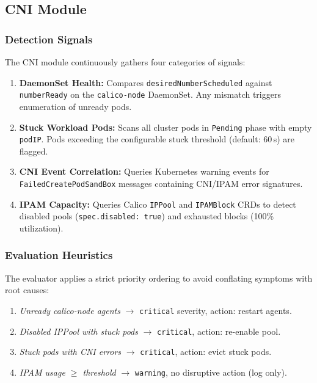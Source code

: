 \documentclass[conference]{IEEEtran}
\begin{document}
\subsection{CNI Module}

\subsubsection{Detection Signals}
The CNI module continuously gathers four categories of signals:
\begin{enumerate}
  \item \textbf{DaemonSet Health:} Compares \texttt{desiredNumberScheduled} against \texttt{numberReady} on the \texttt{calico-node} DaemonSet. Any mismatch triggers enumeration of unready pods.
  \item \textbf{Stuck Workload Pods:} Scans all cluster pods in \texttt{Pending} phase with empty \texttt{podIP}. Pods exceeding the configurable stuck threshold (default: 60\,s) are flagged.
  \item \textbf{CNI Event Correlation:} Queries Kubernetes warning events for \texttt{FailedCreatePodSandBox} messages containing CNI/IPAM error signatures.
  \item \textbf{IPAM Capacity:} Queries Calico \texttt{IPPool} and \texttt{IPAMBlock} CRDs to detect disabled pools (\texttt{spec.disabled:~true}) and exhausted blocks (100\% utilization).
\end{enumerate}

\subsubsection{Evaluation Heuristics}
The evaluator applies a strict priority ordering to avoid conflating symptoms with root causes:
\begin{enumerate}
  \item \emph{Unready calico-node agents} $\to$ \texttt{critical} severity, action: restart agents.
  \item \emph{Disabled IPPool with stuck pods} $\to$ \texttt{critical}, action: re-enable pool.
  \item \emph{Stuck pods with CNI errors} $\to$ \texttt{critical}, action: evict stuck pods.
  \item \emph{IPAM usage $\geq$ threshold} $\to$ \texttt{warning}, no disruptive action (log only).
\end{enumerate}
\end{document}
